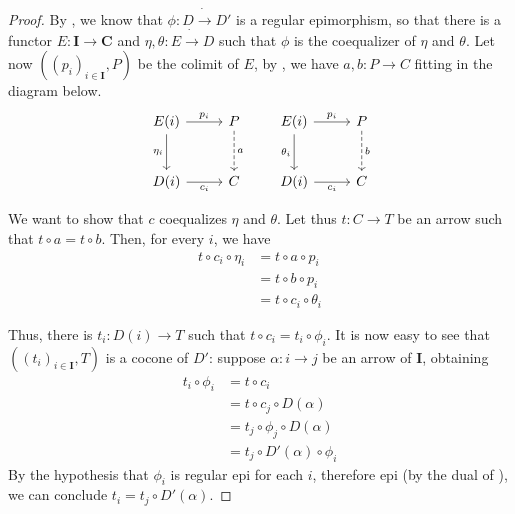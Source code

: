 \documentclass[runningheads,envcountsect]{llncs}
\newcommand{\cat}[1]{\ensuremath{\mathbf{#1}}}
\begin{document}
\begin{proof}
    By , we know that $\phi: D \dot\to D'$ is a regular epimorphism, so that there is a functor $E: \cat{I \to C}$ and $\eta, \theta: E \dot\to D$ such that $\phi$ is the coequalizer of $\eta$ and $\theta$. Let now $((p_i)_{i \in \cat I}, P)$ be the colimit of $E$, by , we have $a, b: P \to C$ fitting in the diagram below.
    \[
        \begin{tikzcd}[row sep = 26, column sep = 26]
            E(i) \ar[r, "{p_i}"] \ar[d, "{\eta_i}"swap] & P \ar[d, dashed, "a"] \\
            D(i) \ar[r, "{c_i}"swap] & C
        \end{tikzcd}
        \qquad
        \begin{tikzcd}[row sep = 26, column sep = 26]
            E(i) \ar[r, "{p_i}"] \ar[d, "{\theta_i}"swap] & P \ar[d, dashed, "b"] \\
            D(i) \ar[r, "{c_i}"swap] & C
        \end{tikzcd}
    \]

    We want to show that $c$ coequalizes $\eta$ and $\theta$. Let thus $t: C \to T$ be an arrow such that $t \circ a = t \circ b$. Then, for every $i$, we have
    \begin{align*}
        t \circ c_i \circ \eta_i &= t \circ a \circ p_i \\
                                 &= t \circ b \circ p_i \\
                                 &= t \circ c_i \circ \theta_i
    \end{align*}    

    Thus, there is $t_i: D(i) \to T$ such that $t\circ c_i = t_i \circ \phi_i$. It is now easy to see that $((t_i)_{i \in \cat I}, T)$ is a cocone of $D'$: suppose $\alpha: i \to j$ be an arrow of $\cat I$, obtaining
    \begin{align*}
        t_i \circ \phi_i &= t \circ c_i \\
                         &= t \circ c_j \circ D(\alpha) \\
                         &= t_j \circ \phi_j \circ D(\alpha) \\
                         &= t_j \circ D'(\alpha) \circ \phi_i
    \end{align*}
    By the hypothesis that $\phi_i$ is regular epi for each $i$, therefore epi (by the dual of ), we can conclude $t_i = t_j \circ D'(\alpha)$.
    

\end{proof}
\end{document}
